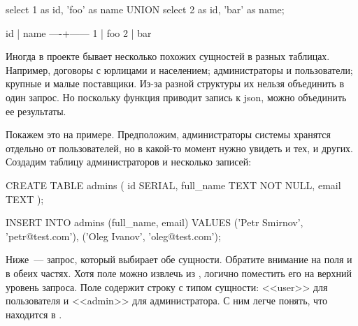 \begin{english}
  \begin{sql}
select 1 as id, 'foo' as name
UNION
select 2 as id, 'bar' as name;
  \end{sql}
\end{english}


\begin{english}
  \begin{text}
 id | name
----+------
  1 | foo
  2 | bar
  \end{text}
\end{english}

Иногда в проекте бывает несколько похожих сущностей в разных таблицах. Например, договоры с юрлицами и населением; администраторы и пользователи; крупные и малые поставщики. Из-за разной структуры их нельзя объединить в один запрос. Но поскольку функция  приводит запись к json, можно объединить ее результаты.

Покажем это на примере. Предположим, администраторы системы хранятся отдельно от пользователей, но в какой-то момент нужно увидеть и тех, и других. Создадим таблицу администраторов и несколько записей:

\begin{english}
  \begin{sql}
CREATE TABLE admins (
  id SERIAL,
  full_name TEXT NOT NULL,
  email TEXT
);

INSERT INTO admins (full_name, email)
VALUES ('Petr Smirnov', 'petr@test.com'),
       ('Oleg Ivanov', 'oleg@test.com');
  \end{sql}
\end{english}

Ниже~--- запрос, который выбирает обе сущности. Обратите внимание на поля  и  в обеих частях. Хотя поле  можно извлечь из , логично поместить его на верхний уровень запроса. Поле  содержит строку с типом сущности: <<user>> для пользователя и <<admin>> для администратора. С ним легче понять, что находится в .

